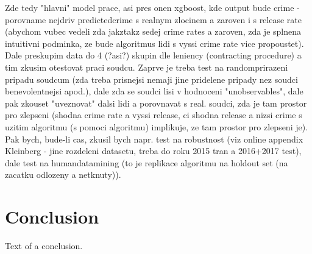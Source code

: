 \documentclass[12pt, twoside]{book} %
\begin{document}
Zde tedy "hlavni" model prace, asi pres onen xgboost, kde output bude crime - porovname nejdriv predictedcrime s realnym zlocinem a zaroven i s release rate (abychom vubec vedeli zda jakztakz sedej crime rates a zaroven, zda je splnena intuitivni podminka, ze bude algoritmus lidi s vyssi crime rate vice propoustet). Dale preskupim data do 4 (?asi?) skupin dle leniency (contracting procedure) a tim zkusim otestovat praci soudcu. Zaprve je treba test na randomprirazeni pripadu soudcum (zda treba prisnejsi nemaji jine pridelene pripady nez soudci benevolentnejsi apod.), dale zda se soudci lisi v hodnoceni "unobservables", dale pak zkouset "uveznovat" dalsi lidi a porovnavat s real. soudci, zda je tam prostor pro zlepseni (shodna crime rate a vyssi release, ci shodna release a nizsi crime s uzitim algoritmu (s pomoci algoritmu) implikuje, ze tam prostor pro zlepseni je).\newline
Pak bych, bude-li cas, zkusil bych napr. test na robustnost (viz online appendix Kleinberg - jine rozdeleni datasetu, treba do roku 2015 tran a 2016+2017 test), dale test na humandatamining (to je replikace algoritmu na holdout set (na zacatku odlozeny a netknuty)).





\chapter*{Conclusion}          %

Text of a conclusion.




\end{document}
